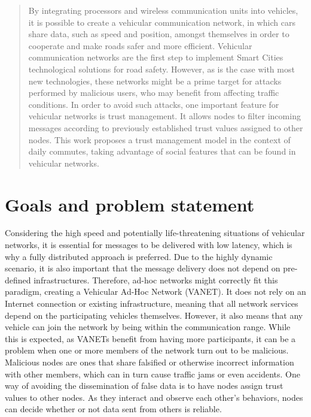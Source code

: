 \documentclass[12pt]{article}
\begin{document}
\begin{abstract}
By integrating processors and wireless communication units into vehicles, it is possible to create a vehicular communication network, in which cars share data, such as speed and position, amongst themselves in order to cooperate and make roads safer and more efficient. Vehicular communication networks are the first step to implement Smart Cities technological solutions for road safety.
However, as is the case with most new technologies, these networks might be a prime target for attacks performed by malicious users, who may benefit from affecting traffic conditions.
In order to avoid such attacks, one important feature for vehicular networks is trust management. It allows nodes to filter incoming messages according to previously established trust values assigned to other nodes.
This work proposes a trust management model in the context of daily commutes, taking advantage of social features that can be found in vehicular networks.
\end{abstract}



\section{Goals and problem statement}
Considering the high speed and potentially life-threatening situations of vehicular networks, it is essential for messages to be delivered with low latency, which is why a fully distributed approach is preferred. Due to the highly dynamic scenario, it is also important that the message delivery does not depend on pre-defined infrastructures.
Therefore, ad-hoc networks might correctly fit this paradigm, creating a Vehicular Ad-Hoc Network (VANET). It does not rely on an Internet connection or existing infrastructure, meaning that all network services depend on the participating vehicles themselves.
However, it also means that any vehicle can join the network by being within the communication range.
While this is expected, as VANETs benefit from having more participants, it can be a problem when one or more members of the network turn out to be malicious.
Malicious nodes are ones that share falsified or otherwise incorrect information with other members, which can in turn cause traffic jams or even accidents.
One way of avoiding the dissemination of false data is to have nodes assign trust values to other nodes.
As they interact and observe each other's behaviors, nodes can decide whether or not data sent from others is reliable.
\end{document}
